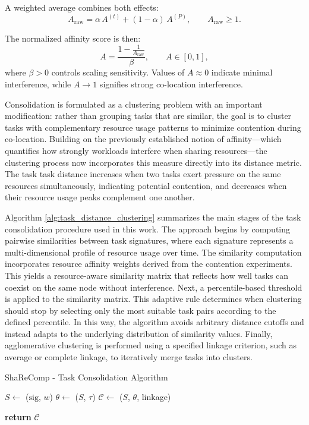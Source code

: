 A weighted average combines both effects:
\[
    A_{\text{raw}} =
    \alpha\, A^{(t)} + (1 - \alpha)\, A^{(P)},
    \qquad A_{\text{raw}} \ge 1.
\]

The normalized affinity score is then:
\[
    A =
    \frac{1 - \frac{1}{A_{\text{raw}}}}{\beta},
    \qquad A \in [0, 1],
\]
where \(\beta > 0\) controls scaling sensitivity.
Values of $A \approx 0$ indicate minimal interference,
while \(A \to 1\) signifies strong co-location interference.


Consolidation is formulated as a clustering problem with an important modification: rather than grouping tasks that are similar, the goal is to cluster tasks with complementary resource usage patterns to minimize contention during co-location. Building on the previously established notion of affinity—which quantifies how strongly workloads interfere when sharing resources—the clustering process now incorporates this measure directly into its distance metric. The task task distance increases when two tasks exert pressure on the same resources simultaneously, indicating potential contention, and decreases when their resource usage peaks complement one another.

Algorithm \ref{alg:task_distance_clustering} summarizes the main stages of the task consolidation procedure used in this work. The approach begins by computing pairwise similarities between task signatures, where each signature represents a multi-dimensional profile of resource usage over time. The similarity computation incorporates resource affinity weights derived from the contention experiments. This yields a resource-aware similarity matrix that reflects how well tasks can coexist on the same node without interference.
Next, a percentile-based threshold is applied to the similarity matrix. This adaptive rule determines when clustering should stop by selecting only the most suitable task pairs according to the defined percentile. In this way, the algorithm avoids arbitrary distance cutoffs and instead adapts to the underlying distribution of similarity values.
Finally, agglomerative clustering is performed using a specified linkage criterion, such as average or complete linkage, to iteratively merge tasks into clusters.

\begin{algorithm}[H]
    \caption{ShaReComp - Task Consolidation Algorithm}
    \label{alg:task_distance_clustering}


    $S \gets$ \Sim($\mathrm{sig}$, $w$) 
    $\theta \gets$ \Thresh($S$, $\tau$) 
    $\mathcal{C} \gets$ \Merge($S$, $\theta$, linkage) 

    \textbf{return } $\mathcal{C}$
\end{algorithm}

